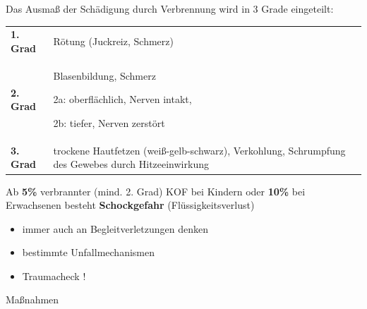 \documentclass{article}
\newcommand\gEs[1]{\textbf{\textcolor[rgb]{0.0,0.0,0.5019608}{#1}}}
\newcommand\gEs[1]{\textbf{\textcolor[rgb]{0.0,0.0,0.5019608}{#1}}}
\begin{document}
Das Ausma{\ss} der Sch\"adigung durch Verbrennung wird in 3 Grade
eingeteilt:

\begin{flushleft}
\begin{tabular}{|m{1.836cm}|m{6.8980002cm}|m{4.3630004cm}|}
\hline
\centering {\bfseries\upshape\color[rgb]{0.0,0.0,0.5019608} Grad}\par

 &
 &
\\\hline
\centering \gEs{1. Grad}\par

 &
{\mdseries R\"otung (Juckreiz, Schmerz)}

 &
\\\hline
\centering \gEs{2. Grad}\par

 &
{\mdseries Blasenbildung, Schmerz}

{\mdseries 2a: oberfl\"achlich, Nerven intakt, }

{\mdseries 2b: tiefer, Nerven zerst\"ort}

 &
\\\hline
\centering \gEs{3. Grad}\par

 &
{\mdseries trockene Hautfetzen (wei{\ss}-gelb-schwarz), Verkohlung,
Schrumpf\-ung des Gewebes durch Hitze\-ein\-wirkung}

 &
\\\hline
\end{tabular}
\end{flushleft}
{\mdseries\color{black}
Ab \gEs{5\%} verbrannter (mind. 2. Grad) KOF bei
Kindern oder \gEs{10\%} bei Erwachsenen besteht
\gEs{Schockgefahr} (Fl\"ussigkeitsverlust)}

\begin{itemize}
\item {\mdseries
immer  auch an Begleitverletzungen  denken}

\item {\mdseries
bestimmte Unfallmechanismen}

\item {\mdseries
Traumacheck !}

\end{itemize}
{\mdseries\color{black}
Ma{\ss}nahmen}
\end{document}
